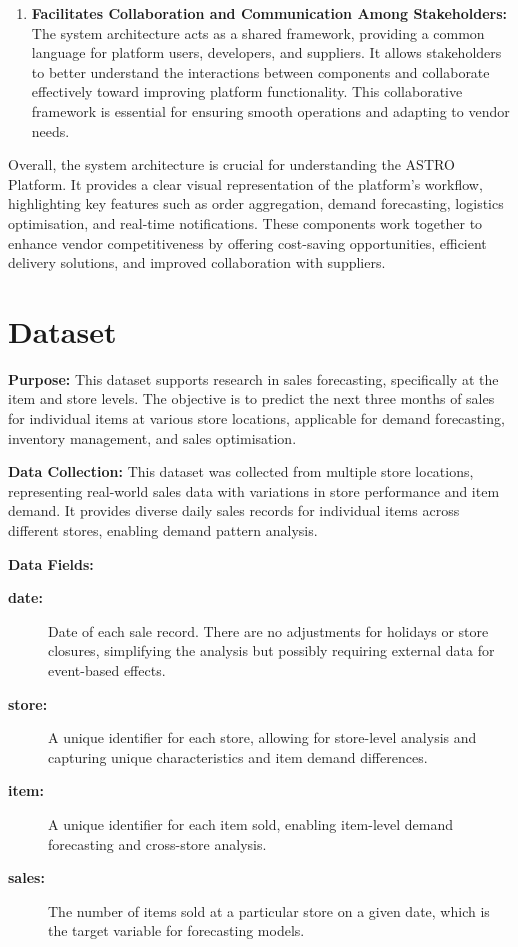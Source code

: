 \begin{enumerate}
    \item \textbf{Facilitates Collaboration and Communication Among Stakeholders:} The system architecture acts as a shared framework, providing a common language for platform users, developers, and suppliers. It allows stakeholders to better understand the interactions between components and collaborate effectively toward improving platform functionality. This collaborative framework is essential for ensuring smooth operations and adapting to vendor needs.

\end{enumerate}

\noindent Overall, the system architecture is crucial for understanding the ASTRO Platform. It provides a clear visual representation of the platform’s workflow, highlighting key features such as order aggregation, demand forecasting, logistics optimisation, and real-time notifications. These components work together to enhance vendor competitiveness by offering cost-saving opportunities, efficient delivery solutions, and improved collaboration with suppliers.

\section{Dataset}
\textbf{Purpose:} This dataset supports research in sales forecasting, specifically at the item and store levels. The objective is to predict the next three months of sales for individual items at various store locations, applicable for demand forecasting, inventory management, and sales optimisation.

\textbf{Data Collection:} This dataset was collected from multiple store locations, representing real-world sales data with variations in store performance and item demand. It provides diverse daily sales records for individual items across different stores, enabling demand pattern analysis.

\textbf{Data Fields:}
\begin{description}
    \item[\textbf{date:}] Date of each sale record. There are no adjustments for holidays or store closures, simplifying the analysis but possibly requiring external data for event-based effects.
    \item[\textbf{store:}] A unique identifier for each store, allowing for store-level analysis and capturing unique characteristics and item demand differences.
    \item[\textbf{item:}] A unique identifier for each item sold, enabling item-level demand forecasting and cross-store analysis.
    \item[\textbf{sales:}] The number of items sold at a particular store on a given date, which is the target variable for forecasting models.
\end{description}

